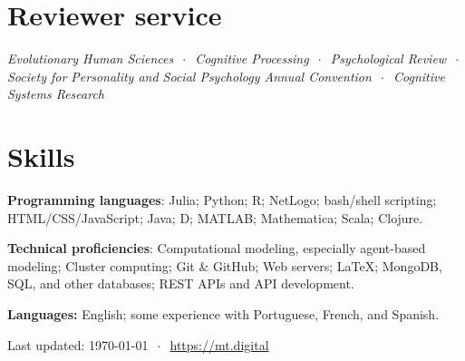 \documentclass[11pt, letterpaper]{article}
\begin{document}
\section*{Reviewer service}

\emph{Evolutionary Human Sciences} $~\cdot~$ \emph{Cognitive Processing} $~\cdot~$ \emph{Psychological Review} $~\cdot~$ \emph{Society for Personality and Social Psychology Annual Convention} $~\cdot~$ \emph{Cognitive Systems Research}

\section*{Skills}

  \textbf{Programming languages}: Julia; Python; R; NetLogo; bash/shell scripting; 
  HTML/CSS/JavaScript; Java; D; MATLAB; Mathematica; Scala; Clojure.

  \textbf{Technical proficiencies}: Computational 
  modeling, especially agent-based modeling; Cluster computing;
  Git \& GitHub; Web servers; \LaTeX; MongoDB, SQL, and other databases; 
  REST APIs and API development.

  \textbf{Languages:} English; some experience with Portuguese, French,
  and Spanish.

\vfill
\hrulefill

\begin{center}
  {\scriptsize  Last updated: \today\- $~\cdot~$ \- 
\href{mt.digital}{https://mt.digital}}
\end{center}
\end{document}
